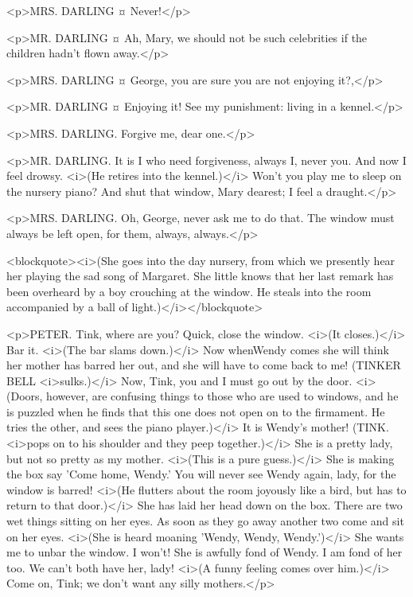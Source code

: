 <p>MRS. DARLING ¤
Never!</p>

<p>MR. DARLING ¤
Ah, Mary, we should not be such celebrities if the children hadn't flown away.</p>

<p>MRS. DARLING ¤
George, you are sure you are not enjoying it?,</p>

<p>MR. DARLING ¤
Enjoying it! See my punishment: living in a kennel.</p>

<p>MRS. DARLING. Forgive me, dear one.</p>

<p>MR. DARLING. It is I who need forgiveness, always I, never you. And now I feel drowsy. <i>(He retires into the kennel.)</i> Won't you play me to sleep on the nursery piano? And shut that window, Mary dearest; I feel a draught.</p>

<p>MRS. DARLING. Oh, George, never ask me to do that. The window must always be left open, for them, always, always.</p>

<blockquote><i>(She goes into the day nursery, from which we presently hear her playing the sad song of Margaret. She little knows that her last remark has been overheard by a boy crouching at the window. He steals into the room accompanied by a ball of light.)</i></blockquote>

<p>PETER. Tink, where are you? Quick, close the window. <i>(It closes.)</i> Bar it. <i>(The bar slams down.)</i> Now whenWendy comes she will think her mother has barred her out, and she will have to come back to me! (TINKER BELL <i>sulks.)</i> Now, Tink, you and I must go out by the door. <i>(Doors, however, are confusing things to those who are used to windows, and he is puzzled when he finds that this one does not open on to the firmament. He tries the other, and sees the piano player.)</i> It is Wendy's mother! (TINK. <i>pops on to his shoulder and they peep together.)</i> She is a pretty lady, but not so pretty as my mother. <i>(This is a pure guess.)</i> She is making the box say 'Come home, Wendy.' You will never see Wendy again, lady, for the window is barred! <i>(He flutters about the room joyously like a bird, but has to return to that door.)</i> She has laid her head down on the box. There are two wet things sitting on her eyes. As soon as they go away another two come and sit on her eyes. <i>(She is heard moaning 'Wendy, Wendy, Wendy.')</i> She wants me to unbar the window. I won't! She is awfully fond of Wendy. I am fond of her too. We can't both have her, lady! <i>(A funny feeling comes over him.)</i> Come on, Tink; we don't want any silly mothers.</p>

